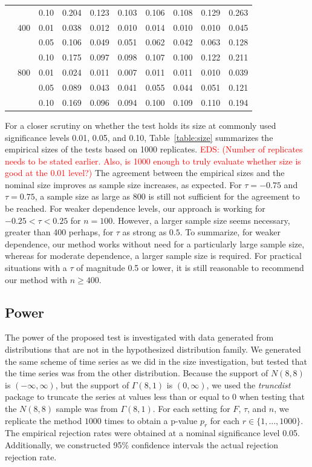 \documentclass[APA,Times1COL]{WileyNJDv5} %
\newcommand{\eds}[1]{\textcolor{red}{EDS: (#1)}}
\begin{document}
\begin{table}[tbp]
\begin{tabular}{lllrrrrrrr}
  & & 0.10 & 0.204 & 0.123 & 0.103 & 0.106 & 0.108 & 0.129 & 0.263 \\ 
  & {400} & 0.01 & 0.038 & 0.012 & 0.010 & 0.014 & 0.010 & 0.010 & 0.045 \\ 
  & & 0.05 & 0.106 & 0.049 & 0.051 & 0.062 & 0.042 & 0.063 & 0.128 \\ 
  & & 0.10 & 0.175 & 0.097 & 0.098 & 0.107 & 0.100 & 0.122 & 0.211 \\ 
  & {800} & 0.01 & 0.024 & 0.011 & 0.007 & 0.011 & 0.011 & 0.010 & 0.039 \\ 
  & & 0.05 & 0.089 & 0.043 & 0.041 & 0.055 & 0.044 & 0.051 & 0.121 \\ 
  & & 0.10 & 0.169 & 0.096 & 0.094 & 0.100 & 0.109 & 0.110 & 0.194 \\ 
   \bottomrule
\end{tabular}
\end{table}


For a closer scrutiny on whether the test holds its size at commonly used
significance levels 0.01, 0.05, and 0.10, Table~\ref{table:size}
summarizes the empirical sizes of the tests based on 1000 replicates.
\eds{Number of replicates needs to be stated earlier.  Also, is 1000 enough
to truly evaluate whether size is good at the 0.01 level?}
The agreement between the empirical sizes and the nominal size
improves as sample size increases, as expected. For $\tau = -0.75$
and $\tau = 0.75$, a sample size as large as 800 is still not sufficient for the
agreement to be reached. For weaker dependence levels, our approach is working
for $-0.25 < \tau < 0.25$ for $n = 100$. However, a larger sample size seems 
necessary, greater than 400 perhaps, for $\tau$ as strong as $0.5$. To 
summarize, for weaker dependence, our method works without need for a 
particularly large sample size, whereas for moderate dependence, a larger sample
size is required. For practical situations with a $\tau$ of magnitude 0.5 or
lower, it is still reasonable to recommend our method with $n \ge 400$.



\subsection{Power}
The power of the proposed test is investigated with data generated from
distributions that are not in the hypothesized distribution family. 
We generated the same scheme of time series as we did in the size investigation,
but tested that the time series was from the other distribution.
Because the support of $N(8, 8)$ is
$(-\infty, \infty)$, but the support of $\Gamma(8, 1)$ is $(0, \infty)$, we used
the \textsl{truncdist} package \citep{truncdist} to truncate the series at 
values less than or equal to 0 when testing that the $N(8, 8)$ sample was
from $\Gamma(8, 1)$. For each setting for $F$, $\tau$, and $n$, we replicate the 
method $1000$ times 
to obtain a p-value $p_r$ for each $r \in \{1, \ldots, 1000\}$.
The empirical rejection rates were obtained at a nominal significance level 0.05.
Additionally, we constructed 95\% confidence intervals the actual rejection
rejection rate.
\end{document}
